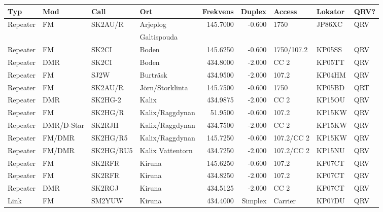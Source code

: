 {\begin{landscape}
\begin{longtable}{llllrrlll}
\bf Typ  & \bf Mod     & \bf Call & \bf Ort     & \bf Frekvens & \bf Duplex & \bf Access & \bf Lokator & \bf QRV? \\ \hline \endhead
Repeater   & FM          & SK2AU/R   & Arjeplog           & 145.7000     & -0.600     & 1750       & JP86XC      & QRV      \\
           &             &           & Galtispouda        &              &            &            &             &          \\
Repeater   & FM          & SK2CI     & Boden              & 145.6250     & -0.600     & 1750/107.2 & KP05SS      & QRV      \\
Repeater   & DMR         & SK2CI     & Boden              & 434.8000     & -2.000     & CC 2       & KP05TT      & QRV      \\
Repeater   & FM          & SJ2W      & Burträsk           & 434.9500     & -2.000     & 107.2      & KP04HM      & QRV      \\
Repeater   & FM          & SK2AU/R   & Jörn/Storklinta    & 145.7500     & -0.600     & 1750       & KP05BD      & QRT      \\
Repeater   & DMR         & SK2HG-2   & Kalix              & 434.9875     & -2.000     & CC 2       & KP15OU      & QRV      \\
Repeater   & FM          & SK2HG/R   & Kalix/Raggdynan    & 51.9500      & -0.600     & 107.2      & KP15KW      & QRV      \\
Repeater   & DMR/D-Star  & SK2RJH    & Kalix/Raggdynan    & 434.7500     & -2.000     & CC 2       & KP15KW      & QRV      \\
Repeater   & FM/DMR      & SK2HG/R5  & Kalix/Raggdynan    & 145.7250     & -0.600     & 107.2/CC 2 & KP15KW      & QRV      \\
Repeater   & FM/DMR      & SK2HG/RU5 & Kalix Vattentorn   & 434.7250     & -2.000     & 107.2/CC 2 & KP15NU      & QRV      \\
Repeater   & FM          & SK2RFR    & Kiruna             & 145.6250     & -0.600     & 107.2      & KP07CT      & QRV      \\
Repeater   & FM          & SK2RFR    & Kiruna             & 434.8250     & -2.000     & 107.2      & KP07CT      & QRV      \\
Repeater   & DMR         & SK2RGJ    & Kiruna             & 434.5125     & -2.000     & CC 2       & KP07CT      & QRV      \\
Link       & FM          & SM2YUW    & Kiruna             & 434.4000     & Simplex    & Carrier    & KP07DU      & QRV      \\

\end{longtable}
\end{landscape}}
